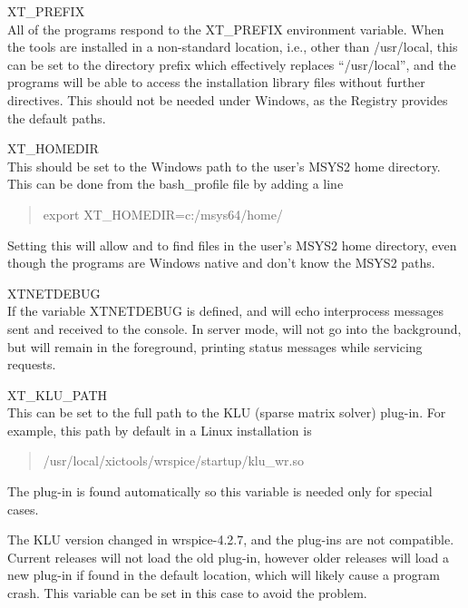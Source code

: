 \begin{description}
\item{\et XT\_PREFIX}\\
All of the {\XicTools} programs respond to the {\et XT\_PREFIX}
environment variable.  When the tools are installed in a non-standard
location, i.e., other than {\vt /usr/local}, this can be set to the
directory prefix which effectively replaces ``{\vt /usr/local}'', and
the programs will be able to access the installation library files
without further directives.  This should not be needed under Windows,
as the Registry provides the default paths.

\item{\et XT\_HOMEDIR}\\
This should be set to the Windows path to the user's MSYS2 home
directory.  This can be done from the {\vt bash\_profile} file by
adding a line
\begin{quote}
{\vt export XT_HOMEDIR=c:/msys64/home/}{\ityourlogin}
\end{quote}
Setting this will allow {\Xic} and {\WRspice} to find files in the
user's MSYS2 home directory, even though the programs are Windows
native and don't know the MSYS2 paths.

\item{\et XTNETDEBUG}\\
If the variable {\et XTNETDEBUG} is defined, {\Xic} and {\WRspice}
will echo interprocess messages sent and received to the console.  In
server mode, {\Xic} will not go into the background, but will remain
in the foreground, printing status messages while servicing requests.

\item{\et XT\_KLU\_PATH}\\
This can be set to the full path to the KLU (sparse matrix solver)
plug-in.  For example, this path by default in a Linux installation is
\begin{quote}\vt
/usr/local/xictools/wrspice/startup/klu\_wr.so
\end{quote}
The plug-in is found automatically so this variable is needed only for
special cases. 

The KLU version changed in wrspice-4.2.7, and the plug-ins are not
compatible.  Current {\WRspice} releases will not load the old
plug-in, however older releases will load a new plug-in if found in
the default location, which will likely cause a program crash.  This
variable can be set in this case to avoid the problem.


\end{description}
